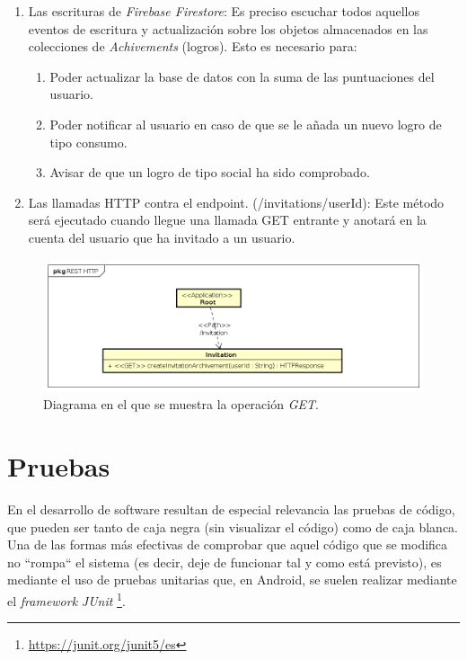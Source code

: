 \documentclass[twoside]{report}
\begin{document}
\begin{enumerate}
\item Las escrituras de \textit{Firebase Firestore}: Es preciso escuchar todos aquellos eventos de escritura y actualización sobre los objetos almacenados en las colecciones de \textit{Achivements} (logros). Esto es necesario para:
	\begin{enumerate}
		\item Poder actualizar la base de datos con la suma de las puntuaciones del usuario.
		\item Poder notificar al usuario en caso de que se le añada un nuevo logro de tipo consumo.
		\item Avisar de que un logro de tipo social ha sido comprobado.
	\end{enumerate}

\item Las llamadas HTTP contra el endpoint. (/invitations/{userId}): Este método será ejecutado cuando llegue una llamada GET entrante y anotará en la cuenta del usuario que ha invitado a un usuario.
\end{enumerate}


\begin{figure}[H]
\centering
\includegraphics[width=\textwidth]{images/restAPI}
\caption{Diagrama en el que se muestra la operación \textit{GET}.}
\end{figure}

\section{Pruebas}


En el desarrollo de software resultan de especial relevancia las pruebas de código, que pueden ser tanto de caja negra (sin visualizar el código) como de caja blanca. Una de las formas más efectivas de comprobar que aquel código que se modifica no “rompa“ el sistema (es decir, deje de funcionar tal y como está previsto), es mediante el uso de pruebas unitarias que, en Android, se suelen realizar mediante el \textit{framework} \textit{JUnit} \footnote{\url{https://junit.org/junit5/es}}. 
\end{document}

